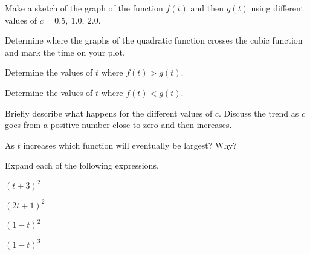 \begin{problem}
  \scalebox{0.7}{}

  \begin{subproblem}
  \item Make a sketch of the graph of the function $f(t)$ and then
    $g(t)$ using different values of $c=0.5,~1.0,~2.0$.
  \item Determine where the graphs of the quadratic function crosses the
    cubic function and mark the time on your plot.
    \clearpage
  \item Determine the values of $t$ where $f(t)>g(t)$.
    \vfill
  \item Determine the values of $t$ where $f(t)<g(t)$.
    \vfill
  \item Briefly describe what happens for the different values of
    $c$. Discuss the trend as $c$ goes from a positive number close to
    zero and then increases.
    \vfill
  \item As $t$ increases which function will eventually be largest?
    Why?
    \vfill
  \end{subproblem}


\end{problem}




\begin{problem}
\item Expand each of the following expressions.
  \begin{subproblem}
    \item $(t+3)^2$
      \vfill
    \item $(2t+1)^2$
      \vfill
    \item $(1-t)^2$
      \vfill
    \item $(1-t)^3$
      \vfill
  \end{subproblem}
\end{problem}


